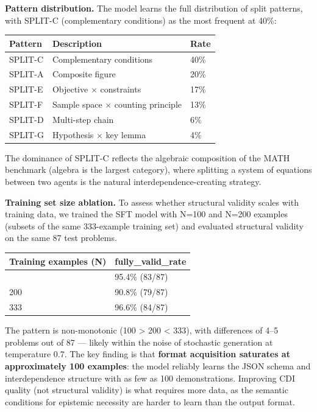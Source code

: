 \documentclass[
  11pt,
]{article}
\newcounter{none} %
\begin{document}
\textbf{Pattern distribution.} The model learns the full distribution of
split patterns, with SPLIT-C (complementary conditions) as the most
frequent at 40\%:

{\def\LTcaptype{none} %
\begin{longtable}[]{@{}lll@{}}
\toprule\noalign{}
Pattern & Description & Rate \\
\midrule\noalign{}
\endhead
\bottomrule\noalign{}
\endlastfoot
SPLIT-C & Complementary conditions & 40\% \\
SPLIT-A & Composite figure & 20\% \\
SPLIT-E & Objective $\times$ constraints & 17\% \\
SPLIT-F & Sample space $\times$ counting principle & 13\% \\
SPLIT-D & Multi-step chain & 6\% \\
SPLIT-G & Hypothesis $\times$ key lemma & 4\% \\
\end{longtable}
}

The dominance of SPLIT-C reflects the algebraic composition of the MATH
benchmark (algebra is the largest category), where splitting a system of
equations between two agents is the natural interdependence-creating
strategy.

\textbf{Training set size ablation.} To assess whether structural
validity scales with training data, we trained the SFT model with N=100
and N=200 examples (subsets of the same 333-example training set) and
evaluated structural validity on the same 87 test problems.

{\def\LTcaptype{none} %
\begin{longtable}[]{@{}ll@{}}
\toprule\noalign{}
Training examples (N) & fully\_valid\_rate \\
\midrule\noalign{}
\endhead
\bottomrule\noalign{}
\endlastfoot
100 & 95.4\% (83/87) \\
200 & 90.8\% (79/87) \\
333 & 96.6\% (84/87) \\
\end{longtable}
}

The pattern is non-monotonic (100 \textgreater{} 200 \textless{} 333),
with differences of 4--5 problems out of 87 --- likely within the noise
of stochastic generation at temperature 0.7. The key finding is that
\textbf{format acquisition saturates at approximately 100 examples}: the
model reliably learns the JSON schema and interdependence structure with
as few as 100 demonstrations. Improving CDI quality (not structural
validity) is what requires more data, as the semantic conditions for
epistemic necessity are harder to learn than the output format.
\end{document}
